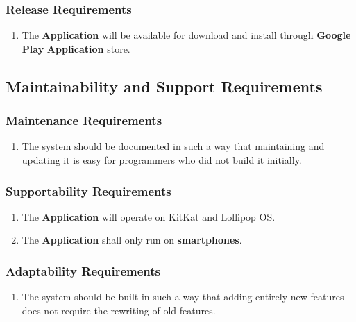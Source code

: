 \documentclass[english]{article}
\begin{document}
\subsubsection{Release Requirements}
\label{ssub:release_requirements}
\begin{enumerate}[{RR}1. ]
	\item The \textbf{Application} will be available for download and install through \textbf{Google Play} \textbf{Application} store.
\end{enumerate}


\subsection{Maintainability and Support Requirements}
\label{sub:maintainability_and_support_requirements}

\subsubsection{Maintenance Requirements}
\label{ssub:maintenance_requirements}
\begin{enumerate}[{MR}1. ]
	\item The system should be documented in such a way that maintaining and updating it is easy for programmers who did not build it initially.
\end{enumerate}

\subsubsection{Supportability Requirements}
\label{ssub:supportability_requirements}
\begin{enumerate}[{MSR}1. ]
	\item The \textbf{Application} will operate on KitKat and Lollipop OS. 
	\item The \textbf{Application} shall only run on \textbf{smartphones}.
\end{enumerate}

\subsubsection{Adaptability Requirements}
\label{ssub:adaptability_requirements}
\begin{enumerate}[{MAR}1. ]
	\item The system should be built in such a way that adding entirely new features does not require the rewriting of old features. 
\end{enumerate}
\end{document}
